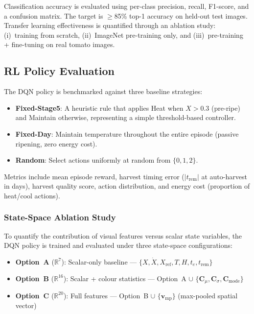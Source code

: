 \documentclass[conference]{IEEEtran}
\begin{document}
    Classification accuracy is evaluated using per-class precision, recall, F1-score, and a confusion matrix. The target is $\geq$85\% top-1 accuracy on held-out test images. Transfer learning effectiveness is quantified through an ablation study: (i)~training from scratch, (ii)~ImageNet pre-training only, and (iii)~pre-training + fine-tuning on real tomato images.

    \subsection{RL Policy Evaluation}

    The DQN policy is benchmarked against three baseline strategies:

    \begin{itemize}
        \item \textbf{Fixed-Stage5}: A heuristic rule that applies Heat when $X > 0.3$ (pre-ripe) and Maintain otherwise, representing a simple threshold-based controller.
        \item \textbf{Fixed-Day}: Maintain temperature throughout the entire episode (passive ripening, zero energy cost).
        \item \textbf{Random}: Select actions uniformly at random from $\{0, 1, 2\}$.
    \end{itemize}

    \noindent Metrics include mean episode reward, harvest timing error ($|t_{\text{rem}}|$ at auto-harvest in days), harvest quality score, action distribution, and energy cost (proportion of heat/cool actions).

    \subsubsection{State-Space Ablation Study}

    To quantify the contribution of visual features versus scalar state variables, the DQN policy is trained and evaluated under three state-space configurations:

    \begin{itemize}
        \item \textbf{Option~A} ($\mathbb{R}^{7}$): Scalar-only baseline --- $\{X, \dot{X}, X_{\text{ref}}, T, H, t_e, t_{\text{rem}}\}$
        \item \textbf{Option~B} ($\mathbb{R}^{16}$): Scalar + colour statistics --- Option~A $\cup$ $\{\mathbf{C}_\mu, \mathbf{C}_\sigma, \mathbf{C}_{\text{mode}}\}$
        \item \textbf{Option~C} ($\mathbb{R}^{20}$): Full features --- Option~B $\cup$ $\{\mathbf{v}_{\text{mp}}\}$ (max-pooled spatial vector)
    \end{itemize}
\end{document}

